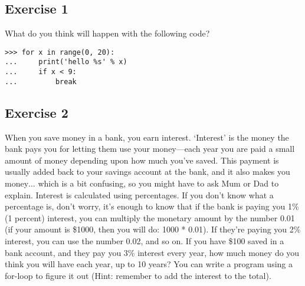 \subsection*{Exercise 1}
What do you think will happen with the following code?

\begin{listing}
\begin{verbatim}
>>> for x in range(0, 20):
...     print('hello %s' % x)
...     if x < 9:
...         break
\end{verbatim}
\end{listing}

\subsection*{Exercise 2}
When you save money in a bank, you earn interest.  `Interest' is the money the bank pays you for letting them use your money---each year you are paid a small amount of money depending upon how much you've saved.  This payment is usually added back to your savings account at the bank, and it also makes you money$\ldots$ which is a bit confusing, so you might have to ask Mum or Dad to explain.
Interest is calculated using percentages.  If you don't know what a percentage is, don't worry, it's enough to know that if the bank is paying you 1\% (1 percent) interest, you can multiply the monetary amount by the number 0.01 (if your amount is \$1000, then you will do: 1000 * 0.01).  If they're paying you 2\% interest, you can use the number 0.02, and so on.  
If you have \$100 saved in a bank account, and they pay you 3\% interest every year, how much money do you think you will have each year, up to 10 years?  You can write a program using a for-loop to figure it out  (Hint: remember to add the interest to the total).
\newpage